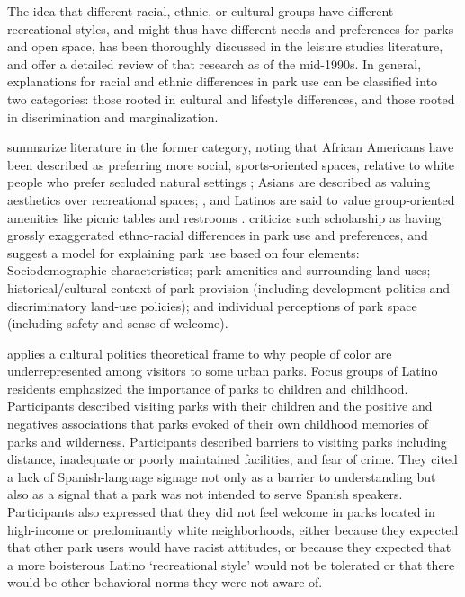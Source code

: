 \documentclass[3p, authoryear, review]{elsarticle} %
\begin{document}
The idea that different racial, ethnic, or cultural groups have different
recreational styles, and might thus have different needs and preferences for
parks and open space, has been thoroughly discussed in the leisure studies
literature, and \citet{husbands1995ethnicity} offer a detailed review of that research
as of the mid-1990s. In general, explanations for racial and ethnic differences
in park use can be classified into two categories: those rooted in cultural and
lifestyle differences, and those rooted in discrimination and marginalization.

\citet{byrne2009nature} summarize literature in the former category, noting that
African Americans have been described as preferring more social,
sports-oriented spaces, relative to white people who prefer secluded natural
settings \citep{washburne1978black, hutchison1987ethnicity, floyd1999convergence, gobster2002managing, payne2002examination, ho2005gender}; Asians are
described as valuing aesthetics over recreational spaces;
\citep{gobster2002managing, payne2002examination, ho2005gender}, and Latinos are
said to value group-oriented amenities like picnic tables and restrooms
\citep{baas1993influence, hutchison1987ethnicity, irwin1990mexican}.
\citet{byrne2009nature} criticize such scholarship as having grossly exaggerated
ethno-racial differences in park use and preferences, and suggest a model for
explaining park use based on four elements: Sociodemographic characteristics;
park amenities and surrounding land uses; historical/cultural context of park
provision (including development politics and discriminatory land-use
policies); and individual perceptions of park space (including safety and
sense of welcome).

\citet{byrne2012green} applies a cultural politics theoretical frame to why people of
color are underrepresented among visitors to some urban parks. Focus groups of
Latino residents emphasized the importance of parks to children and childhood.
Participants described visiting parks with their children and the positive and
negatives associations that parks evoked of their own childhood memories of
parks and wilderness. Participants described barriers to visiting parks
including distance, inadequate or poorly maintained facilities, and fear of
crime. They cited a lack of Spanish-language signage not only as a barrier to
understanding but also as a signal that a park was not intended to serve
Spanish speakers. Participants also expressed that they did not feel welcome
in parks located in high-income or predominantly white neighborhoods, either
because they expected that other park users would have racist attitudes, or
because they expected that a more boisterous Latino `recreational style' would
not be tolerated or that there would be other behavioral norms they were not
aware of.
\end{document}
